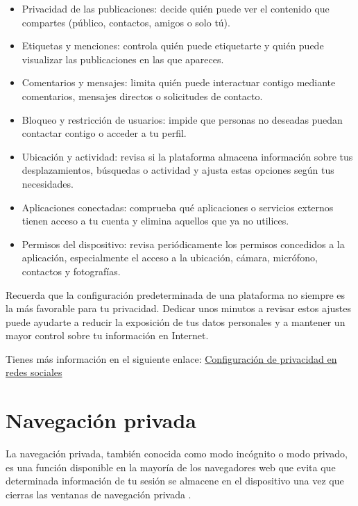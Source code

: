\documentclass[
  spanish,
  a4paper,
  openany]{book}
\begin{document}
\begin{itemize}
\item
  Privacidad de las publicaciones: decide quién puede ver el contenido que compartes (público, contactos, amigos o solo tú).
\item
  Etiquetas y menciones: controla quién puede etiquetarte y quién puede visualizar las publicaciones en las que apareces.
\item
  Comentarios y mensajes: limita quién puede interactuar contigo mediante comentarios, mensajes directos o solicitudes de contacto.
\item
  Bloqueo y restricción de usuarios: impide que personas no deseadas puedan contactar contigo o acceder a tu perfil.
\item
  Ubicación y actividad: revisa si la plataforma almacena información sobre tus desplazamientos, búsquedas o actividad y ajusta estas opciones según tus necesidades.
\item
  Aplicaciones conectadas: comprueba qué aplicaciones o servicios externos tienen acceso a tu cuenta y elimina aquellos que ya no utilices.
\item
  Permisos del dispositivo: revisa periódicamente los permisos concedidos a la aplicación, especialmente el acceso a la ubicación, cámara, micrófono, contactos y fotografías.
\end{itemize}

Recuerda que la configuración predeterminada de una plataforma no siempre es la más favorable para tu privacidad. Dedicar unos minutos a revisar estos ajustes puede ayudarte a reducir la exposición de tus datos personales y a mantener un mayor control sobre tu información en Internet.

Tienes más información en el siguiente enlace: \href{https://www.incibe.es/ciudadania/tematicas/privacidad/configuraciones-redes-sociales}{Configuración de privacidad en redes sociales}

\section{Navegación privada}\label{navegaciuxf3n-privada}

La navegación privada, también conocida como modo incógnito o modo privado, es una función disponible en la mayoría de los navegadores web que evita que determinada información de tu sesión se almacene en el dispositivo una vez que cierras las ventanas de navegación privada \citep{navegacion-privada}.
\end{document}
